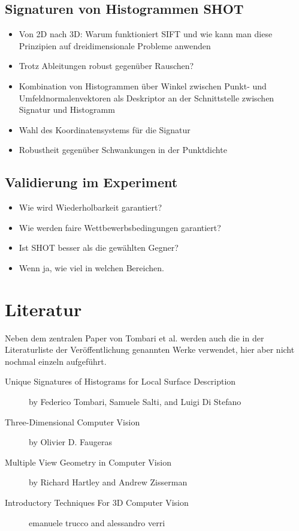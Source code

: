 \documentclass[12pt]{article}
\begin{document}
\subsection{Signaturen von Histogrammen \textbf{SHOT}}
\begin{itemize}
	\item{ 
		Von 2D nach 3D: Warum funktioniert SIFT und wie kann man diese Prinzipien auf dreidimensionale Probleme anwenden}
	\item{
		Trotz Ableitungen robust gegenüber Rauschen? 
	} 
	\item {
		Kombination von Histogrammen über Winkel zwischen Punkt- und Umfeldnormalenvektoren als Deskriptor an der Schnittstelle zwischen Signatur und Histogramm
	}
	\item{
		Wahl des Koordinatensystems für die Signatur
	}
	\item{
		Robustheit gegenüber Schwankungen in der Punktdichte
	}
\end{itemize}
\subsection{Validierung im Experiment}
\begin{itemize}
	\item Wie wird Wiederholbarkeit garantiert?
	\item Wie werden faire Wettbewerbsbedingungen garantiert?
	\item Ist SHOT besser als die gewählten Gegner?
	\item Wenn ja, wie viel in welchen Bereichen.
\end{itemize}
\section{Literatur}
Neben dem zentralen Paper von Tombari et al. werden auch die in der Literaturliste der Veröffentlichung genannten Werke verwendet, hier aber nicht nochmal einzeln aufgeführt.
\begin{description}
	\item[Unique Signatures of Histograms for Local Surface
Description]{
	by Federico Tombari, Samuele Salti, and Luigi Di Stefano
} 
	\item[Three-Dimensional Computer Vision]{
	 by Olivier D. Faugeras
	}
	\item[Multiple View Geometry in Computer Vision]{
	 by Richard Hartley and Andrew Zisserman
	}
	\item[Introductory Techniques For 3D Computer Vision]{
emanuele trucco and alessandro verri
	}

\end{description}
\end{document}
